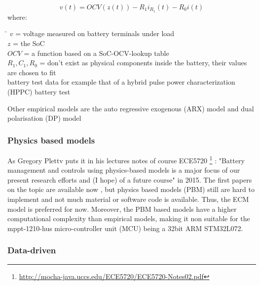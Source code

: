 \begin{equation}
{v}(t) = {OCV}(z(t)) - {R}_{1} {i}_{R_1}(t) - {R}_{0} i(t)
\label{equation:ECM}
\end{equation}
where: 
\begin{tabbing}
\phantom{$v(t)  \  \ \ \ \ \ \ \ \ \ \ \ $}\= \kill
$v$\> =  voltage measured on battery terminals under load   \\
$z  $\> = the SoC  \\
$OCV $\>  = a function based on a SoC-OCV-lookup table \\
$R_1,C_1,R_0$\> = don't exist as physical components inside the battery, their values are chosen to fit  \\
battery test data for example that of a hybrid pulse power characterization (HPPC) battery test  \\ %

\end{tabbing}

Other empirical models are the auto regressive exogenous (ARX) model and dual polarisation (DP) model %

\subsubsection{Physics based models}
\label{section:Physics based models}

As Gregory Plettv puts it in his lectures notes of course ECE5720  \footnote{ \url{http://mocha-java.uccs.edu/ECE5720/ECE5720-Notes02.pdf}} :  "Battery management and controls using physics-based models is a major focus of our present research efforts and (I hope) of a future
course" in 2015. The first papers on the topic are available now \cite{9477587}, but physics based models (PBM) still are hard to implement and not much material or software code is available. Thus, the ECM model is preferred for now. Moreover, the PBM based models have a higher computational complexity than
empirical models, making it non suitable for the mppt-1210-hus micro-controller unit (MCU) being a 32bit ARM STM32L072. %


\subsubsection{Data-driven}
\label{section:Data-driven}

